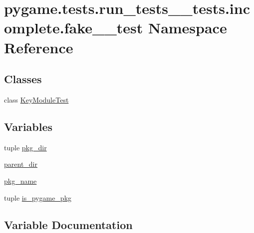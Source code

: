 \hypertarget{namespacepygame_1_1tests_1_1run__tests____tests_1_1incomplete_1_1fake__3__test}{}\section{pygame.\+tests.\+run\+\_\+tests\+\_\+\+\_\+tests.\+incomplete.\+fake\+\_\+\_\+test Namespace Reference}
\label{namespacepygame_1_1tests_1_1run__tests____tests_1_1incomplete_1_1fake__3__test}
\subsection*{Classes}
\begin{DoxyCompactItemize}
\item 
class \hyperlink{classpygame_1_1tests_1_1run__tests____tests_1_1incomplete_1_1fake__3__test_1_1_key_module_test}{Key\+Module\+Test}
\end{DoxyCompactItemize}
\subsection*{Variables}
\begin{DoxyCompactItemize}
\item 
tuple \hyperlink{namespacepygame_1_1tests_1_1run__tests____tests_1_1incomplete_1_1fake__3__test_a4d92e59104cc8fc6e7320a5581be00c7}{pkg\+\_\+dir}
\item 
\hyperlink{namespacepygame_1_1tests_1_1run__tests____tests_1_1incomplete_1_1fake__3__test_a485c24bab6f1742daf7f8f06835b9132}{parent\+\_\+dir}
\item 
\hyperlink{namespacepygame_1_1tests_1_1run__tests____tests_1_1incomplete_1_1fake__3__test_a44cadd7130d4e7c258ab869a10386e01}{pkg\+\_\+name}
\item 
tuple \hyperlink{namespacepygame_1_1tests_1_1run__tests____tests_1_1incomplete_1_1fake__3__test_aaf3f226e217d6ee6df743a02c78e69cd}{is\+\_\+pygame\+\_\+pkg}
\end{DoxyCompactItemize}


\subsection{Variable Documentation}
\mbox{\label{namespacepygame_1_1tests_1_1run__tests____tests_1_1incomplete_1_1fake__3__test_aaf3f226e217d6ee6df743a02c78e69cd}} 

